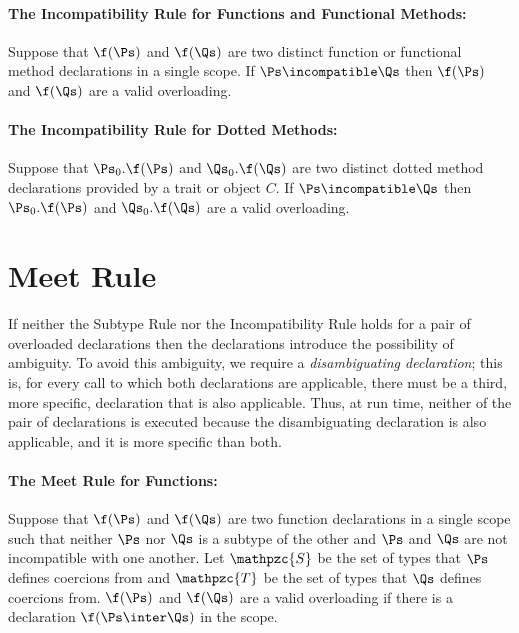 \paragraph{The Incompatibility Rule for Functions and Functional Methods:}

Suppose that $\f(\Ps)$ and $\f(\Qs)$ are two distinct function or
functional method declarations in a single scope.
If $\Ps \incompatible \Qs$ then $\f(\Ps)$ and $\f(\Qs)$ are a valid overloading.

\paragraph{The Incompatibility Rule for Dotted Methods:}
Suppose that $\Ps_0.\f(\Ps)$ and $\Qs_0.\f(\Qs)$ are two distinct
dotted method declarations provided by a trait or object $C$.  If
$\Ps \incompatible \Qs$ then $\Ps_0.\f(\Ps)$ and $\Qs_0.\f(\Qs)$ are
a valid overloading.

\section{Meet Rule}

If neither the Subtype Rule nor the Incompatibility Rule holds for a
pair of overloaded declarations then the declarations introduce the
possibility of ambiguity.  To avoid this ambiguity, we require a
\emph{disambiguating declaration}; this is, for every call to which
both declarations are applicable, there must be a third, more
specific, declaration that is also applicable.  Thus, at run time,
neither of the pair of declarations is executed because the
disambiguating declaration is also applicable, and it is more specific
than both.


\paragraph{The Meet Rule for Functions:}
Suppose that $\f(\Ps)$ and $\f(\Qs)$ are two function
declarations in a single scope
such that neither $\Ps$ nor $\Qs$ is a subtype of the other and $\Ps$ and
$\Qs$ are not incompatible with one another.
Let $\mathpzc{S}$ be the set of types that $\Ps$ defines coercions from
and $\mathpzc{T}$ be the set of types that $\Qs$ defines coercions from.
$\f(\Ps)$ and $\f(\Qs)$ are a valid overloading if
there is a declaration $\f(\Ps \inter \Qs)$ in the scope.

